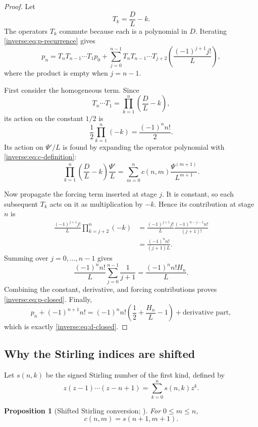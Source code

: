 \documentclass[11pt,oneside]{article}
\newtheorem{proposition}[proposition]{Proposition}
\theoremstyle{definition}
\theoremstyle{remark}
\begin{document}
\begin{proof}
Let
\[
 T_k=\frac DL-k.
\]
The operators $T_k$ commute because each is a polynomial in $D$.  Iterating
\eqref{inverse:eq:p-recurrence} gives
\begin{equation}
 p_n=T_nT_{n-1}\cdots T_1p_0
 +\sum_{j=0}^{n-1}
   T_nT_{n-1}\cdots T_{j+2}
   \left(\frac{(-1)^{j+1}j!}{L}\right),
 \label{inverse:eq:p-iteration}
\end{equation}
where the product is empty when $j=n-1$.

First consider the homogeneous term.  Since
\[
 T_n\cdots T_1
 =\prod_{k=1}^n\left(\frac DL-k\right),
\]
its action on the constant $1/2$ is
\[
 \frac12\prod_{k=1}^n(-k)=\frac{(-1)^nn!}{2}.
\]
Its action on $\Psi'/L$ is found by expanding the operator polynomial with
\eqref{inverse:eq:c-definition}:
\[
 \prod_{k=1}^n\left(\frac DL-k\right)\frac{\Psi'}L
 =\sum_{m=0}^n
   c(n,m)\frac{\Psi^{(m+1)}}{L^{m+1}}.
\]

Now propagate the forcing term inserted at stage $j$.  It is constant, so
each subsequent $T_k$ acts on it as multiplication by $-k$.  Hence its
contribution at stage $n$ is
\begin{align*}
 \frac{(-1)^{j+1}j!}{L}
 \prod_{k=j+2}^n(-k)
 &=
 \frac{(-1)^{j+1}j!}{L}
 \frac{(-1)^{n-j-1}n!}{(j+1)!}\\
 &=\frac{(-1)^nn!}{(j+1)L}.
\end{align*}
Summing over $j=0,\dots,n-1$ gives
\[
 \frac{(-1)^nn!}{L}\sum_{j=0}^{n-1}\frac1{j+1}
 =\frac{(-1)^nn!H_n}{L}.
\]
Combining the constant, derivative, and forcing contributions proves
\eqref{inverse:eq:p-closed}.  Finally,
\[
 p_n+(-1)^{n+1}n!
 =(-1)^nn!\left(\frac12+\frac{H_n}{L}-1\right)
   +\text{derivative part},
\]
which is exactly \eqref{inverse:eq:d-closed}.
\end{proof}

\subsection{Why the Stirling indices are shifted}

Let $s(n,k)$ be the signed Stirling number of the first kind, defined by
\[
 z(z-1)\cdots(z-n+1)=\sum_{k=0}^n s(n,k)z^k.
\]

\begin{proposition}[Shifted Stirling conversion; \Formalized]
\label{inverse:prop:stirling-shift}
For $0\leq m\leq n$,
\[
 c(n,m)=s(n+1,m+1).
\]
\end{proposition}
\end{document}
